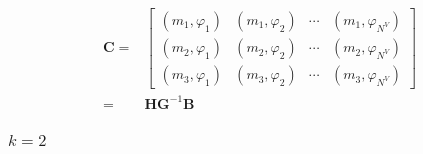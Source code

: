 \begin{equation*}
\begin{aligned}
\mathbf C =& \begin{bmatrix}
(m_1, \varphi_1) & (m_1, \varphi_2) & \cdots & (m_1, \varphi_{N^{V}}) \\
(m_2, \varphi_1) & (m_2, \varphi_2) & \cdots & (m_2, \varphi_{N^{V}})\\
(m_{3}, \varphi_1) & (m_{3}, \varphi_2) & \cdots & (m_{3},\varphi_{N^{V}})
\end{bmatrix}\\
= & \mathbf H\mathbf G^{-1}\mathbf B
\end{aligned}
\end{equation*}

\subsubsection{$k = 2$}

